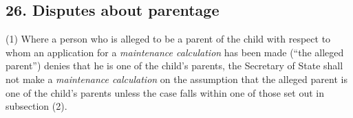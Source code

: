 \documentclass[12pt,a4paper]{article}
\begin{document}
%
%
%
%
%
%
%

\subsection{26. Disputes about parentage}

(1) Where a person who is alleged to be a parent of the child with respect to whom an application for a 
\emph{maintenance calculation}  %
has been made 
(“the alleged parent”) denies that he is one of the child’s parents, 
the 
Secretary of State  %
shall not make a 
\emph{maintenance calculation}  %
on the assumption that the alleged parent is one of the child’s parents unless the case falls within one of those set out in subsection (2).
\end{document}
